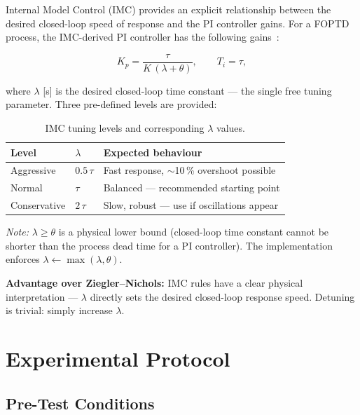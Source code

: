 Internal Model Control (IMC) provides an explicit relationship between the desired
closed-loop speed of response and the PI controller gains. For a FOPTD process,
the IMC-derived PI controller has the following gains~\cite{Rivera1986}:

\begin{equation}
  \boxed{K_p = \frac{\tau}{K\,(\lambda + \theta)}, \qquad T_i = \tau},
  \label{eq:imc}
\end{equation}

where $\lambda$ [\si{\second}] is the desired closed-loop time constant --- the single
free tuning parameter. Three pre-defined levels are provided:

\begin{table}[H]
  \centering
  \caption{IMC tuning levels and corresponding $\lambda$ values.}
  \label{tab:imc_levels}
  \begin{tabular}{@{}L{3.5cm}C{3.0cm}L{6.5cm}@{}}
    \toprule
    \textbf{Level} & \textbf{$\lambda$} & \textbf{Expected behaviour} \\
    \midrule
    Aggressive  & $0.5\,\tau$   & Fast response, $\sim$10\,\% overshoot possible \\
    Normal      & $\tau$        & Balanced --- recommended starting point \\
    Conservative& $2\,\tau$     & Slow, robust --- use if oscillations appear \\
    \bottomrule
  \end{tabular}
\end{table}

\textit{Note:} $\lambda \geq \theta$ is a physical lower bound (closed-loop time constant
cannot be shorter than the process dead time for a PI controller). The implementation
enforces $\lambda \leftarrow \max(\lambda, \theta)$.

\textbf{Advantage over Ziegler--Nichols:} IMC rules have a clear physical interpretation
--- $\lambda$ directly sets the desired closed-loop response speed. Detuning is trivial:
simply increase $\lambda$.

\section{Experimental Protocol}

\subsection{Pre-Test Conditions}

